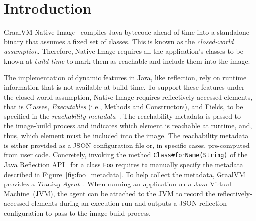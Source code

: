 \chapter{Introduction}





GraalVM Native Image~\cite{noauthor_native_nodate} compiles Java bytecode ahead of time into a standalone binary that assumes a fixed set of classes. This is known as the \emph{closed-world assumption}. Therefore, Native Image requires all the application's classes to be known at \emph{build time} to mark them as reachable and include them into the image.

The implementation of dynamic features in Java, like reflection, rely on runtime information that is not available at build time. To support these features under the closed-world assumption, Native Image requires reflectively-accessed elements, that is Classes, \emph{Executables} (i.e., Methods and Constructors), and Fields, to be specified in the \emph{reachability metadata}~\cite{noauthor_reachability_nodate}. 
The reachability metadata is passed to the image-build process and indicates which element is reachable at runtime, and, thus, which element must be included into the image. 
The reachability metadata is either provided as a JSON configuration file or, in specific cases, pre-computed from user code. 
Concretely, invoking the method \verb|Class#forName(String)| of the Java Reflection API~\cite{noauthor_core_nodate} for a class \verb|Foo| requires to manually specify the metadata described in Figure~\ref{fig:foo_metadata}.
To help collect the metadata, GraalVM provides a \emph{Tracing Agent}~\cite{noauthor_collect_nodate}. When running an application on a Java Virtual Machine~(JVM), the agent can be attached to the JVM to record the reflectively-accessed elements during an execution run and outputs a JSON reflection configuration to pass to the image-build process.

